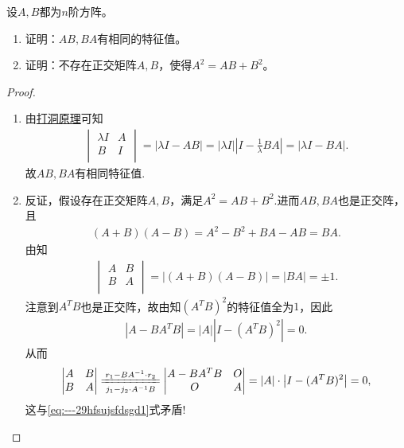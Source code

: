 \documentclass[../../main.tex]{subfiles}%
\begin{document}
\begin{example}
设$A,B$都为$n$阶方阵。
\begin{enumerate}[(1)]
\item 证明：$AB,BA$有相同的特征值。
\item 证明：不存在正交矩阵$A,B$，使得$A^2 = AB + B^2$。
\end{enumerate}
\end{example}
\begin{proof}
\begin{enumerate}[(1)]
\item 由\hyperref[proposition:打洞原理]{打洞原理}可知
\begin{align*}
\begin{vmatrix}
\lambda I& A\\
B& I\\
\end{vmatrix}
=|\lambda I - AB|=|\lambda I|\left|I - \frac{1}{\lambda}BA\right|=|\lambda I - BA|.
\end{align*}
故$AB,BA$有相同特征值.

\item 反证，假设存在正交矩阵$A,B$，满足$A^2=AB+B^2$.进而$AB,BA$也是正交阵，且
\begin{align*}
(A+B)(A-B)=A^2-B^2+BA-AB=BA.
\end{align*}
由知
\begin{align}
\begin{vmatrix}
A& B\\
B& A\\
\end{vmatrix}
=|(A+B)(A-B)|=|BA|=\pm 1.\label{eq:---29hfsujsfdsgd1}
\end{align}
注意到$A^TB$也是正交阵，故由知$(A^TB)^2$的特征值全为$1$，因此
\begin{align*}
|A - BA^TB|=|A|\left|I - (A^TB)^2\right|=0.
\end{align*}
从而
\begin{align*}
\begin{vmatrix}
A& B\\
B& A\\
\end{vmatrix}
\xlongequal[j_1-j_2\cdot A^{-1}B]{r_1-BA^{-1}\cdot r_2}
\begin{vmatrix}
A-BA^TB& O\\
O& A\\
\end{vmatrix}
=|A|\cdot \left|I - (A^TB)^2\right|=0,
\end{align*}
这与\eqref{eq:---29hfsujsfdsgd1}式矛盾!
\end{enumerate}
\end{proof}
\end{document}
